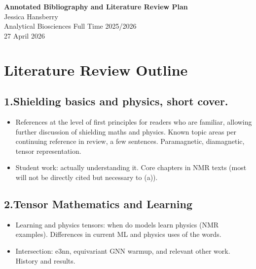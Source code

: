 \documentclass[11pt,a4paper]{article}
\begin{document}
\noindent
\textbf{Annotated Bibliography and Literature Review Plan}\\
Jessica Hansberry\\
Analytical Biosciences Full Time 2025/2026\\
27 April 2026

\bigskip


\section*{Literature Review Outline}

\subsection*{1.\quad Shielding basics and physics, short cover.}
\begin{itemize}
\item[a.] References at the level of first principles for readers who are familiar, allowing further discussion of shielding maths and physics. Known topic areas per continuing reference in review, a few sentences. Paramagnetic, diamagnetic, tensor representation.
\item[b.] Student work: actually understanding it. Core chapters in NMR texts (most will not be directly cited but necessary to (a)).
\end{itemize}

\subsection*{2.\quad Tensor Mathematics and Learning}
\begin{itemize}
\item[a.] Learning and physics tensors: when do models learn physics (NMR examples). Differences in current ML and physics uses of the words.
\item[b.] Intersection: e3nn, equivariant GNN warmup, and relevant other work. History and results.
\end{itemize}
\end{document}
